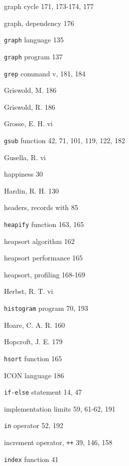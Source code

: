 \begin{multicols}{3}
\hangindent=3pc  graph cycle 171, 173-174, 177

\hangindent=3pc  graph, dependency 176

\hangindent=3pc  \verb'graph' language 135

\hangindent=3pc  \verb'graph' program 137

\hangindent=3pc  \verb'grep' command v, 181, 184

\hangindent=3pc  Griswold, M. 186

\hangindent=3pc  Griswold, R. 186

\hangindent=3pc  Grosse, E. H. vi

\hangindent=3pc  \verb'gsub' function 42, 71, 101, 119, 122, 182

\hangindent=3pc  Gusella, R. vi

\hangindent=3pc  happiness 30

\hangindent=3pc  Hardin, R. H. 130

\hangindent=3pc  headers, records with 85

\hangindent=3pc  \verb'heapify' function 163, 165

\hangindent=3pc  heapsort algorithm 162

\hangindent=3pc  heapsort performance 165

\hangindent=3pc  heapsort, profiling 168-169

\hangindent=3pc  Herbst, R. T. vi

\hangindent=3pc  \verb'histogram' program 70, 193

\hangindent=3pc  Hoare, C. A. R. 160

\hangindent=3pc  Hopcroft, J. E. 179

\hangindent=3pc  \verb'hsort' function 165

\hangindent=3pc  ICON language 186

\hangindent=3pc  \verb'if-else' statement 14, 47

\hangindent=3pc  implementation limits 59, 61-62, 191

\hangindent=3pc  \verb'in' operator 52, 192

\hangindent=3pc  increment operator, \verb'++' 39, 146, 158

\hangindent=3pc  \verb'index' function 41


\end{multicols}
